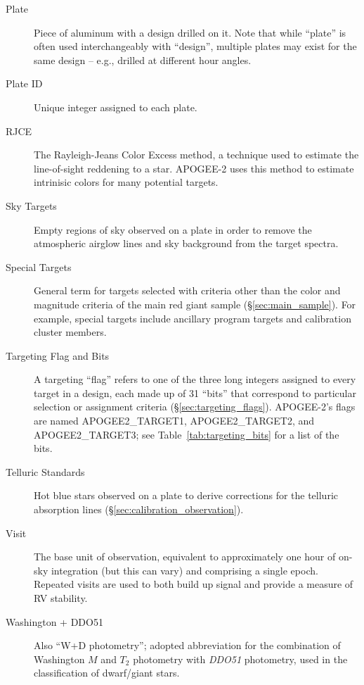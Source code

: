 \documentclass[12pt,twocolumn]{emulateapj}
\begin{document}
\begin{appendix}
\begin{description}
\item[Plate] Piece of aluminum with a design drilled on it.  Note that while ``plate'' is often used interchangeably with ``design'', multiple plates may exist for the same design -- e.g., drilled at different hour angles.
\item[Plate ID] Unique integer assigned to each plate.
\item[RJCE] The Rayleigh-Jeans Color Excess method, a technique used to estimate the line-of-sight reddening to a star.  APOGEE-2 uses this method to estimate intrinisic colors for many potential targets.
\item[Sky Targets] Empty regions of sky observed on a plate in order to remove the atmospheric airglow lines and sky background from the target spectra.
\item[Special Targets] General term for targets selected with criteria other than the color and magnitude criteria of the main red giant sample (\S\ref{sec:main_sample}).  For example, special targets include ancillary program targets and calibration cluster members.
\item[Targeting Flag and Bits] A targeting ``flag'' refers to one of the three long integers assigned to every target in a design, each made up of 31 ``bits'' that correspond to particular selection or assignment criteria (\S\ref{sec:targeting_flags}).  APOGEE-2's flags are named APOGEE2\_TARGET1, APOGEE2\_TARGET2, and APOGEE2\_TARGET3; see Table~\ref{tab:targeting_bits} for a list of the bits.
\item[Telluric Standards] Hot blue stars observed on a plate to derive corrections for the telluric absorption lines (\S\ref{sec:calibration_observation}).
\item[Visit] The base unit of observation, equivalent to approximately one hour of on-sky integration (but this can vary) and comprising a single epoch.  Repeated visits are used to both build up signal and provide a measure of RV stability.
\item[Washington + DDO51] Also ``W+D photometry''; adopted abbreviation for the combination of Washington $M$ and $T_2$ photometry with {\it DDO51} photometry, used in the classification of dwarf/giant stars.
\end{description}


\end{appendix}
\end{document}

